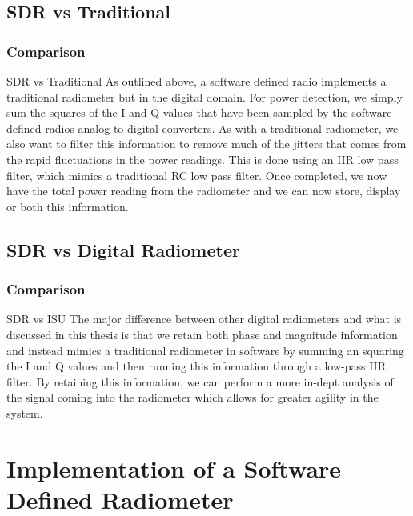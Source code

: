 \documentclass{beamer}
\begin{document}
\subsection{SDR vs Traditional}
\begin{frame}
\frametitle{Comparison}
\begin{block}{SDR vs Traditional}
As outlined above, a software defined radio implements a traditional radiometer but in the digital domain.  For power detection, we simply sum the squares of the I and Q values that have been sampled by the software defined radios analog to digital converters.  As with a traditional radiometer, we also want to filter this information to remove much of the jitters that comes from the rapid fluctuations in the power readings.  This is done using an IIR low pass filter, which mimics a traditional RC low pass filter.  Once completed, we now have the total power reading from the radiometer and we can now store, display or both this information.  
\end{block}
\end{frame}
\subsection{SDR vs Digital Radiometer}
\begin{frame}
\frametitle{Comparison}
\begin{block}{SDR vs ISU}
The major difference between other digital radiometers and what is discussed in this thesis is that we retain both phase and magnitude information and instead mimics a traditional radiometer in software by summing an squaring the I and Q values and then running this information through a low-pass IIR filter.  By retaining this information, we can perform a more in-dept analysis of the signal coming into the radiometer which allows for greater agility in the system.
\end{block}
\end{frame}
\section{Implementation of a Software Defined Radiometer}
\end{document}

